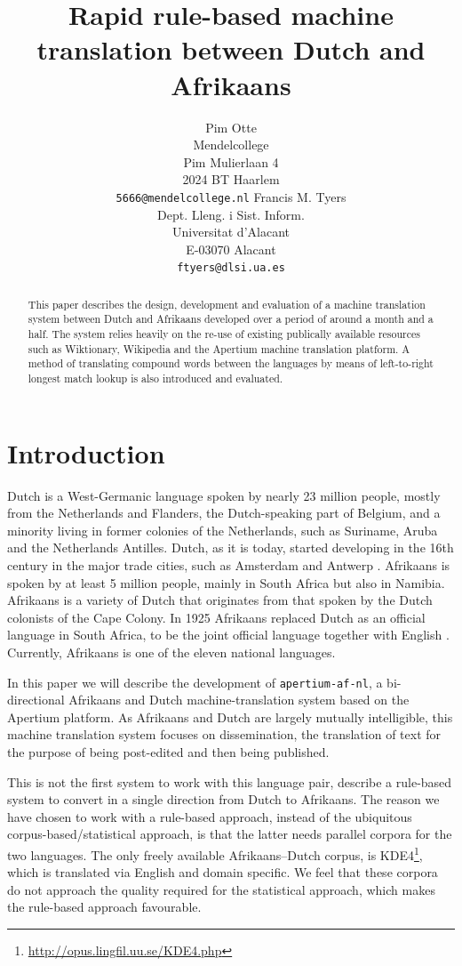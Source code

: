\documentclass[11pt]{article}
\title{Rapid rule-based machine translation between Dutch and Afrikaans}
\author{
Pim Otte\\
  Mendelcollege\\
  Pim Mulierlaan 4\\
  2024 BT Haarlem\\
  {\tt 5666@mendelcollege.nl}  \And
  Francis M. Tyers\\
  Dept. Lleng. i Sist. Inform.\\
  Universitat d'Alacant\\
  E-03070 Alacant \\
  {\tt ftyers@dlsi.ua.es}
}
\date{}
\begin{document}
\maketitle
\begin{abstract}
 This paper describes the design, development and evaluation of a machine
 translation system between Dutch and Afrikaans developed over a period of
 around a month and a half. The system relies heavily on the re-use of existing 
 publically available resources such as Wiktionary, Wikipedia and the 
 Apertium machine translation platform. A method of translating compound
 words between the languages by means of left-to-right longest match
 lookup is also introduced and evaluated.
\end{abstract}

\section{Introduction}

Dutch is a West-Germanic language spoken by nearly 23 million people, 
mostly from the Netherlands and Flanders, the Dutch-speaking part of Belgium, and a minority 
living in former colonies of the Netherlands, such as Suriname, Aruba and the Netherlands 
Antilles. Dutch, as it is today, started developing in the 16th century in the 
major trade cities, such as Amsterdam and Antwerp \cite{Shetter:02}.  Afrikaans is spoken 
by at least 5 million people, mainly in South Africa but also in Namibia. Afrikaans is a 
variety of Dutch that originates from that spoken by the Dutch colonists of 
the Cape Colony. In 1925 Afrikaans replaced Dutch as an official language in South Africa, to 
be the joint official language together with English \cite{Donaldson:93}. Currently, Afrikaans is one of the 
eleven national languages. 

In this paper we will describe the development of {\small {\tt apertium-af-nl}}, a bi-directional Afrikaans 
and Dutch machine-translation system based on the Apertium platform. As Afrikaans and Dutch 
are largely mutually intelligible, this machine translation system focuses on dissemination, the 
translation of text for the purpose of being post-edited and then being published. 

This is not the first system to work with this language pair,  describe
a rule-based system to convert in a single direction from Dutch to Afrikaans. 
The reason we have chosen to work with a rule-based approach, instead of the ubiquitous 
corpus-based/statistical approach, is that the latter needs parallel corpora for the two 
languages. The only freely available Afrikaans--Dutch corpus, is 
KDE4\footnote{\url{http://opus.lingfil.uu.se/KDE4.php}}, which is translated via English and 
domain specific. We feel that these corpora do not approach the quality required for the
statistical approach, which makes the rule-based approach favourable.
\end{document}
